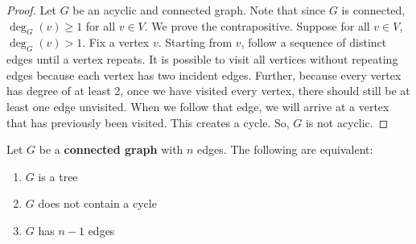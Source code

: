 \begin{proof}
    Let $G$ be an acyclic and connected graph. Note that since $G$ is connected, $\deg_G(v) \geq 1$ for all $v \in V$. We prove the contrapositive. Suppose for all $v \in V$, $\deg_G(v) > 1$. Fix a vertex $v$. Starting from $v$, follow a sequence of distinct edges until a vertex repeats. It is possible to visit all vertices without repeating edges because each vertex has two incident edges. Further, because every vertex has degree of at least 2, once we have visited every vertex, there should still be at least one edge unvisited. When we follow that edge, we will arrive at a vertex that has previously been visited. This creates a cycle. So, $G$ is not acyclic.
\end{proof}

\begin{theorem} \label{thm:equiv-tree-def}
    Let $G$ be a \textbf{connected graph} with $n$ edges. The following are equivalent:
    \begin{enumerate}
        \item $G$ is a tree
        \item $G$ does not contain a cycle
        \item $G$ has $n-1$ edges
    \end{enumerate}
\end{theorem}

